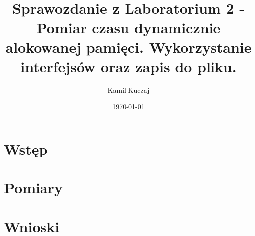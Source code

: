 \documentclass[11pt,a4paper]{article}
\author{Kamil Kuczaj}
\title{Sprawozdanie z Laboratorium 2 - Pomiar czasu dynamicznie alokowanej pamięci. Wykorzystanie interfejsów oraz zapis do pliku.}
\date{\today}
\begin{document}
\maketitle

\section{Wstęp}

\section{Pomiary}

\section{Wnioski}
\end{document}
